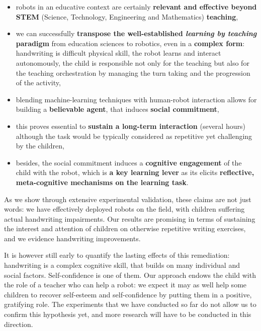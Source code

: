 \documentclass{article}
\begin{document}
\begin{itemize}
    \item robots in an educative context are certainly \textbf{relevant and
        effective beyond STEM} (Science, Technology, Engineering and
        Mathematics) \textbf{teaching},

    \item we can successfully \textbf{transpose the well-established
        \emph{learning by teaching} paradigm} from education sciences to
        robotics, even in a \textbf{complex form}: handwriting is difficult
        physical skill, the robot learns and interact autonomously, the child is
        responsible not only for the teaching but also for the teaching
        orchestration by managing the turn taking and the progression of the
        activity,

    \item blending machine-learning techniques with human-robot interaction
        allows for building a \textbf{believable agent}, that induces
        \textbf{social commitment},

    \item this proves essential to \textbf{sustain a long-term interaction}
        (several hours) although the task would be typically considered as
        repetitive yet challenging by the children,

    \item besides, the social commitment induces a \textbf{cognitive engagement}
        of the child with the robot, which is \textbf{a key learning lever} as its
        elicits \textbf{reflective, meta-cognitive mechanisms on the learning task}.

\end{itemize}

As we show through extensive experimental validation, these claims are not just
words: we have effectively deployed robots on the field, with children suffering
actual handwriting impairments. Our results are promising in terms of sustaining
the interest and attention of children on otherwise repetitive writing exercises,
and we evidence handwriting improvements.

It is however still early to quantify the lasting effects of this remediation:
handwriting is a complex cognitive skill, that builds on many individual and
social factors. Self-confidence is one of them. Our approach endows the child
with the role of a teacher who can help a robot: we expect it may as well help
some children to recover self-esteem and self-confidence by putting them in a
positive, gratifying role. The experiments that we have conducted so far do not
allow us to confirm this hypothesis yet, and more research will have to be
conducted in this direction.
\end{document}
